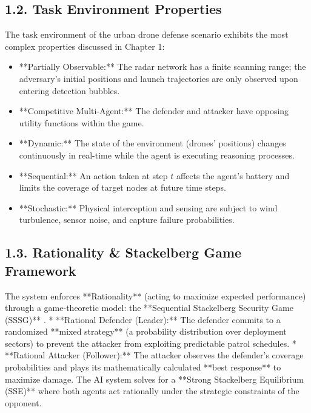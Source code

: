 \documentclass[../main.tex]{subfiles}
\begin{document}
\subsection{1.2. Task Environment Properties}
The task environment of the urban drone defense scenario exhibits the most complex properties discussed in Chapter 1:
\begin{itemize}
    \item **Partially Observable:** The radar network has a finite scanning range; the adversary's initial positions and launch trajectories are only observed upon entering detection bubbles.
    \item **Competitive Multi-Agent:** The defender and attacker have opposing utility functions within the game.
    \item **Dynamic:** The state of the environment (drones' positions) changes continuously in real-time while the agent is executing reasoning processes.
    \item **Sequential:** An action taken at step $t$ affects the agent's battery and limits the coverage of target nodes at future time steps.
    \item **Stochastic:** Physical interception and sensing are subject to wind turbulence, sensor noise, and capture failure probabilities.
\end{itemize}

\subsection{1.3. Rationality \& Stackelberg Game Framework}
The system enforces **Rationality** (acting to maximize expected performance) through a game-theoretic model: the **Sequential Stackelberg Security Game (SSSG)** \cite{mutzari2025defending}.
*   **Rational Defender (Leader):** The defender commits to a randomized **mixed strategy** (a probability distribution over deployment sectors) to prevent the attacker from exploiting predictable patrol schedules.
*   **Rational Attacker (Follower):** The attacker observes the defender's coverage probabilities and plays its mathematically calculated **best response** to maximize damage.
The AI system solves for a **Strong Stackelberg Equilibrium (SSE)** where both agents act rationally under the strategic constraints of the opponent.
\end{document}
